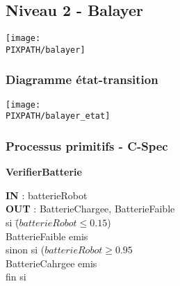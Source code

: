 \subsection{Niveau 2 - Balayer}

\begin{center}
\texttt{[image: \\PIXPATH/balayer]}
\end{center}


\subsubsection{Diagramme état-transition}

\begin{center}
\texttt{[image: \\PIXPATH/balayer\_etat]}
\end{center}

\subsubsection{Processus primitifs - C-Spec}

\begin{description}
	
	\item \textbf{VerifierBatterie}
		\begin{tabbing} 
		\textbf{IN} : batterieRobot \\
		\textbf{OUT} : BatterieChargee, BatterieFaible \\
		si \=($batterieRobot \leq 0.15$) \\
			\>BatterieFaible emis \\
		sinon si ($batterieRobot \geq 0.95$ \\
			\>BatterieCahrgee emis \\
		fin si 
		\end{tabbing}


\end{description}

\vfill
\pagebreak

